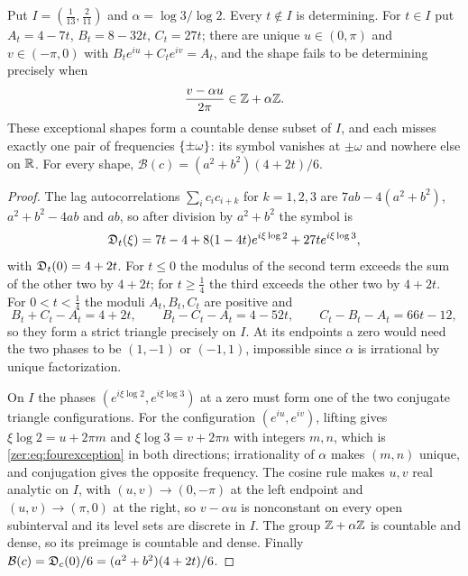 \begin{theorem}\label{zer:thm:fourpoint}
Put $I=(\tfrac1{13},\tfrac2{11})$ and $\alpha=\log3/\log2$. Every $t\notin I$ is determining. For
$t\in I$ put $A_t=4-7t$, $B_t=8-32t$, $C_t=27t$; there are unique $u\in(0,\pi)$ and $v\in(-\pi,0)$
with $B_te^{iu}+C_te^{iv}=A_t$, and the shape fails to be determining precisely when
\begin{equation}\label{zer:eq:fourexception}
 \frac{v-\alpha u}{2\pi}\in\mathbb{Z}+\alpha\mathbb{Z} .
\end{equation}
These exceptional shapes form a countable dense subset of $I$, and each misses exactly one pair of
frequencies $\{\pm\omega\}$: its symbol vanishes at $\pm\omega$ and nowhere else on $\mathbb{R}$. For every
shape, $\mathcal B(c)=(a^2+b^2)(4+2t)/6$.
\end{theorem}
\begin{proof}
The lag autocorrelations $\sum_ic_ic_{i+k}$ for $k=1,2,3$ are $7ab-4(a^2+b^2)$, $a^2+b^2-4ab$ and $ab$,
so after division by $a^2+b^2$ the symbol is
\begin{equation}\label{zer:eq:foursymbol}
 \mathfrak{D}_t(\xi)=7t-4+8(1-4t)e^{i\xi\log2}+27te^{i\xi\log3},
\end{equation}
with $\mathfrak{D}_t(0)=4+2t$. For $t\le0$ the modulus of the second term exceeds the sum of the other two
by $4+2t$; for $t\ge\tfrac14$ the third exceeds the other two by $4+2t$. For $0<t<\tfrac14$ the moduli
$A_t,B_t,C_t$ are positive and
\[
 B_t+C_t-A_t=4+2t,\qquad B_t-C_t-A_t=4-52t,\qquad C_t-B_t-A_t=66t-12 ,
\]
so they form a strict triangle precisely on $I$. At its endpoints a zero would need the two phases
to be $(1,-1)$ or $(-1,1)$, impossible since $\alpha$ is irrational by unique factorization.

On $I$ the phases $(e^{i\xi\log2},e^{i\xi\log3})$ at a zero must form one of the two conjugate
triangle configurations. For the configuration $(e^{iu},e^{iv})$, lifting gives
$\xi\log2=u+2\pi m$ and $\xi\log3=v+2\pi n$ with integers $m,n$, which is \eqref{zer:eq:fourexception} in
both directions; irrationality of $\alpha$ makes $(m,n)$ unique, and conjugation gives the opposite
frequency. The cosine rule makes $u,v$ real analytic on $I$, with $(u,v)\to(0,-\pi)$ at the left
endpoint and $(u,v)\to(\pi,0)$ at the right, so $v-\alpha u$ is nonconstant on every open subinterval
and its level sets are discrete in $I$. The group $\mathbb{Z}+\alpha\mathbb{Z}$ is countable and dense, so its
preimage is countable and dense. Finally $\mathcal B(c)=\mathfrak{D}_c(0)/6=(a^2+b^2)(4+2t)/6$.
\end{proof}

